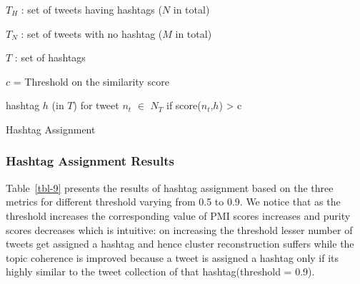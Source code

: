 \documentclass[10pt,a5paper,twoside]{article}
\newcommand{\var}{v}
\begin{document}
\incmargin{1.5em}
\linesnumbered
\begin{algorithm}[hb!]
\dontprintsemicolon

\Input
{
$T_H$ : set of tweets having hashtags ($N$ in total)
 
$T_N$ : set of tweets with no hashtag ($M$ in total)
 
$T$ : set of hashtags
 
$c$ = \footnotesize{Threshold} on the similarity score
}
\Output
{
hashtag $h$ (in $T$) for tweet $n_t$ $\in$ $N_T$ if score($n_t$,$h$) > c
}
\BlankLine
{\small
{}
}
\caption{{\sc Hashtag Assignment} \label{alg-1}}
\end{algorithm}
\decmargin{1.5em}


\subsubsection{Hashtag Assignment Results}

Table~\ref{tbl-9} presents the results of hashtag assignment based on
the three metrics for different threshold varying from 0.5 to 0.9. We
notice that as the threshold increases the corresponding value of PMI
scores increases and purity scores decreases which is intuitive: on
increasing the threshold lesser number of tweets get assigned a
hashtag and hence cluster reconstruction suffers while the topic
coherence is improved because a tweet is assigned a hashtag only if
its highly similar to the tweet collection of that hashtag(threshold =
0.9).
\end{document}
